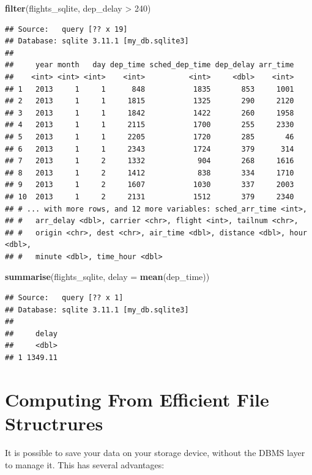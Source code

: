 \documentclass[]{book}
\newenvironment{Shaded}{\begin{snugshade}}{\end{snugshade}}
\newcommand{\KeywordTok}[1]{\textcolor[rgb]{0.13,0.29,0.53}{\textbf{{#1}}}}
\newcommand{\DataTypeTok}[1]{\textcolor[rgb]{0.13,0.29,0.53}{{#1}}}
\newcommand{\DecValTok}[1]{\textcolor[rgb]{0.00,0.00,0.81}{{#1}}}
\newcommand{\StringTok}[1]{\textcolor[rgb]{0.31,0.60,0.02}{{#1}}}
\newcommand{\NormalTok}[1]{{#1}}
\theoremstyle{definition}
\theoremstyle{definition}
\theoremstyle{remark}
\begin{document}
\begin{Shaded}
\begin{Highlighting}[]
\KeywordTok{filter}\NormalTok{(flights_sqlite, dep_delay >}\StringTok{ }\DecValTok{240}\NormalTok{)}
\end{Highlighting}
\end{Shaded}

\begin{verbatim}
## Source:   query [?? x 19]
## Database: sqlite 3.11.1 [my_db.sqlite3]
## 
##     year month   day dep_time sched_dep_time dep_delay arr_time
##    <int> <int> <int>    <int>          <int>     <dbl>    <int>
## 1   2013     1     1      848           1835       853     1001
## 2   2013     1     1     1815           1325       290     2120
## 3   2013     1     1     1842           1422       260     1958
## 4   2013     1     1     2115           1700       255     2330
## 5   2013     1     1     2205           1720       285       46
## 6   2013     1     1     2343           1724       379      314
## 7   2013     1     2     1332            904       268     1616
## 8   2013     1     2     1412            838       334     1710
## 9   2013     1     2     1607           1030       337     2003
## 10  2013     1     2     2131           1512       379     2340
## # ... with more rows, and 12 more variables: sched_arr_time <int>,
## #   arr_delay <dbl>, carrier <chr>, flight <int>, tailnum <chr>,
## #   origin <chr>, dest <chr>, air_time <dbl>, distance <dbl>, hour <dbl>,
## #   minute <dbl>, time_hour <dbl>
\end{verbatim}

\begin{Shaded}
\begin{Highlighting}[]
\KeywordTok{summarise}\NormalTok{(flights_sqlite, }\DataTypeTok{delay =} \KeywordTok{mean}\NormalTok{(dep_time))}
\end{Highlighting}
\end{Shaded}

\begin{verbatim}
## Source:   query [?? x 1]
## Database: sqlite 3.11.1 [my_db.sqlite3]
## 
##     delay
##     <dbl>
## 1 1349.11
\end{verbatim}

\section{Computing From Efficient File
Structrures}\label{file-structure}

It is possible to save your data on your storage device, without the
DBMS layer to manage it. This has several advantages:
\end{document}
